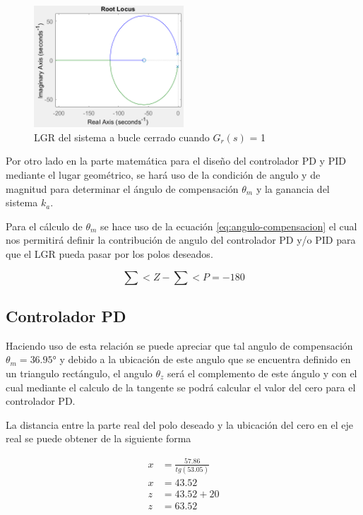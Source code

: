 \documentclass[conference]{IEEEtran}
\begin{document}
	\begin{figure}[h]
		\centering
		\includegraphics[width=0.5\textwidth]{media1/lgr-planta-lc}
		\caption{LGR del sistema a bucle cerrado cuando $G_r(s)$ = 1}
		\label{fig:lgr-planta-lc}
	\end{figure}
	
	Por otro lado en la parte matemática para el diseño del controlador PD y PID mediante el lugar geométrico, se hará uso de la condición de angulo y de magnitud para determinar el ángulo de compensación $\theta_m $ y la ganancia del sistema $k_a$.
	
	Para el cálculo de $\theta_m$ se hace uso de la ecuación \ref{eq:angulo-compensacion} el cual nos permitirá definir la contribución de angulo del controlador PD y/o PID para que el LGR pueda pasar por los polos deseados.
	
	\begin{equation}
		\sum<Z -\sum<P = -180
		\label{eq:angulo-compensacion}
	\end{equation}
	
	\subsection{Controlador PD}
	Haciendo uso de esta relación se puede apreciar que tal angulo de compensación $\theta_m = 36.95°$ y debido a la ubicación de este angulo que se encuentra definido en un triangulo rectángulo, el angulo $\theta_z$ será el complemento de este ángulo y con el cual mediante el calculo de la tangente se podrá calcular el valor del cero para el controlador PD.
	
	La distancia entre la parte real del polo deseado y la ubicación del cero en el eje real se puede obtener de la siguiente forma
	
	\begin{align}
		x &= \frac{57.86}{tg(53.05)} \\
		x &= 43.52 \\
		z &= 43.52 + 20 \\
		z &= 63.52 \\
		\label{eq:cero-pd-1}
	\end{align}
	
\end{document}
